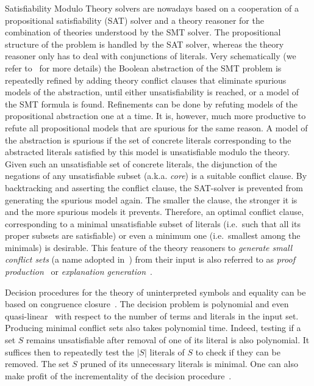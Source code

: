 \documentclass[smallextended]{svjour3}
\begin{document}
Satisfiability Modulo Theory solvers are nowadays based on a cooperation of a
propositional satisfiability (SAT) solver and a theory reasoner for the
combination of theories understood by the SMT solver. The propositional
structure of the problem is handled by the SAT solver, whereas the theory
reasoner only has to deal with conjunctions of literals.  Very schematically (we
refer to~\cite{Barrett14} for more details) the Boolean abstraction of the SMT
problem is repeatedly refined by adding theory conflict clauses that eliminate
spurious models of the abstraction, until either unsatisfiability is reached, or
a model of the SMT formula is found.  Refinements can be done by refuting models
of the propositional abstraction one at a time.  It is, however, much more
productive to refute all propositional models that are spurious for the same
reason.  A model of the abstraction is spurious if the set of concrete literals
corresponding to the abstracted literals satisfied by this model is
unsatisfiable modulo the theory.  Given such an unsatisfiable set of concrete literals, the
disjunction of the negations of any unsatisfiable subset (a.k.a. \emph{core}) is a suitable
conflict clause.  By backtracking and asserting the conflict clause, the
SAT-solver is prevented from generating the spurious model again. The smaller
the clause, the stronger it is and the more spurious models it prevents.
Therefore, an optimal conflict clause, corresponding to a minimal unsatisfiable
subset of literals (i.e.\ such that all its proper subsets are satisfiable) or
even a minimum one (i.e.\ smallest among the minimals) is desirable.  This
feature of the theory reasoners to \emph{generate small conflict sets} (a name
adopted in~\cite{Barrett14}) from their input is also referred to as \emph{proof
production}~\cite{Nieuwenhuis3,Nieuwenhuis9} or \emph{explanation
generation}~\cite{Nieuwenhuis6}.

Decision procedures for the theory of uninterpreted symbols and equality can be
based on congruence closure~\cite{Nelson2,Downey1,Nieuwenhuis6}.  The decision problem is polynomial
and even quasi-linear~\cite{Downey1} with respect to the number of terms and
literals in the input set.  Producing minimal conflict sets also takes
polynomial time.  Indeed, testing if a set $S$ remains unsatisfiable after
removal of one of its literal is also polynomial.  It suffices then to
repeatedly test the $|S|$ literals of $S$ to check if they can be removed.  The
set $S$ pruned of its unnecessary literals is minimal.  One can also make profit of the incrementality of the decision procedure~\cite{Fontaine1}.
\end{document}
